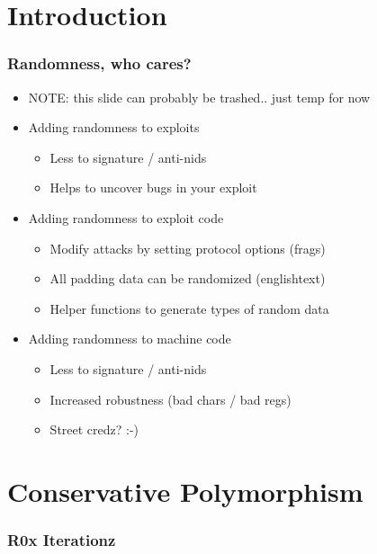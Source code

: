 \documentclass{beamer}
\begin{document}
\section{Introduction}
\begin{frame}
  \frametitle{Randomness, who cares?}
  \begin{itemize}
    \item NOTE: this slide can probably be trashed.. just temp for now
    \item Adding randomness to exploits
    \begin{itemize}
      \item Less to signature / anti-nids
      \item Helps to uncover bugs in your exploit
    \end{itemize}
    \pause
    
	\item Adding randomness to exploit code
    \begin{itemize}
      \item Modify attacks by setting protocol options (frags)
      \item All padding data can be randomized (englishtext)
      \item Helper functions to generate types of random data
    \end{itemize}
		
    \item Adding randomness to machine code
    \begin{itemize}
      \item Less to signature / anti-nids
      \item Increased robustness (bad chars / bad regs)
      \item Street credz? :-)
    \end{itemize}
	
  \end{itemize}
\end{frame}

\section{Conservative Polymorphism}

\newcommand{\incshi}[1]{\texttt{[image: \#1]}}

\begin{frame}
  \frametitle{R0x Iterationz}
  \only<9>{\incshi{shi8}}
  \only<8>{\incshi{shi7}}
  \only<7>{\incshi{shi6}}
  \only<6>{\incshi{shi5}}
  \only<5>{\incshi{shi4}}
  \only<4>{\incshi{shi3}}
  \only<3>{\incshi{shi2}}
  \only<2>{\incshi{shi1}}
  \only<1>{\incshi{shi0}}
\end{frame}
\end{document}
